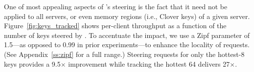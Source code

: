 One of most appealing aspects of \sword's steering is the fact that it
need not be applied to all servers, or even memory regions (i.e.,
Clover keys) of a given server.
Figure~\ref{fig:keys_tracked} shows per-client throughput as a
function of the number of keys steered by \sword.  To accentuate the
impact, we use a Zipf parameter of 1.5---as opposed to 0.99 in prior
experiments---to enhance the locality of requests.  (See Appendix~\ref{ss:zipf} for a full range.)
Steering requests for only the hottest-8 keys provides a 9.5$\times$
improvement while tracking the hottest 64 delivers
27$\times$.



